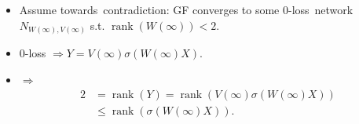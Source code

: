\documentclass[handout,usenames,dvipsnames]{beamer} %
\DeclareMathOperator{\rank}{rank}
\begin{document}
\begin{frame}
    \begin{columns}
        \begin{column}{0.6\textwidth}
            \begin{itemize}[<+->]
                \item Assume towards~contradiction: GF converges to some 0-loss~network $N_{W(\infty),V(\infty)}$ s.t. $\rank(W(\infty))<2$.
                \item 0-loss $\Rightarrow Y = V(\infty) \sigma \left( W(\infty) X \right)$.
                \item $\Rightarrow$ 
                \begin{align*}
                    2 &= \rank(Y) = \rank \left( V(\infty) \sigma \left(W(\infty) X \right) \right) \\
                    &\leq \rank \left( \sigma \left( W(\infty) X \right) \right).
                \end{align*}
            \end{itemize}
        \end{column}
        
    \end{columns}
    

\end{frame}
\end{document}
